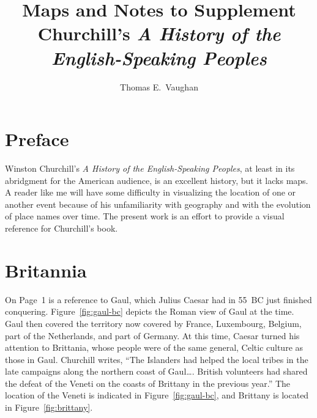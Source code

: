 \documentclass{book}
\title{Maps and Notes to Supplement Churchill's {\it A History of the
English-Speaking Peoples\/}}
\author{Thomas E.~Vaughan}
\begin{document}
\frontmatter

\maketitle

\chapter{Preface}

Winston Churchill's {\it A History of the English-Speaking Peoples}, at least
in its abridgment for the American audience, is an excellent history, but it
lacks maps. A reader like me will have some difficulty in visualizing the
location of one or another event because of his unfamiliarity with geography
and with the evolution of place names over time. The present work is an effort
to provide a visual reference for Churchill's book.

\mainmatter%

\chapter{Britannia}

On Page~1 is a reference to Gaul, which Julius Caesar had in 55~BC just
finished conquering. Figure~\ref{fig:gaul-bc} depicts the Roman view of Gaul at
the time. Gaul then covered the territory now covered by France, Luxembourg,
Belgium, part of the Netherlands, and part of Germany.  At this time, Caesar
turned his attention to Brittania, whose people were of the same general,
Celtic culture as those in Gaul. Churchill writes, ``The Islanders had helped
the local tribes in the late campaigns along the northern coast of Gaul\ldots.
British volunteers had shared the defeat of the Veneti on the coasts of
Brittany in the previous year.'' The location of the Veneti is indicated in
Figure~\ref{fig:gaul-bc}, and Brittany is located in Figure~\ref{fig:brittany}.
\end{document}
